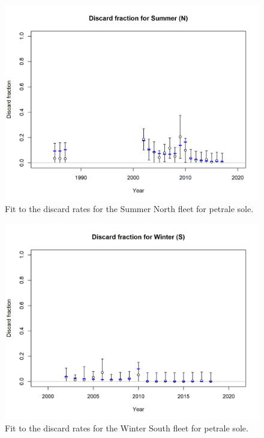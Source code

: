 \documentclass[12pt,]{article}
\begin{document}
\FloatBarrier

\begin{figure}
\centering
\includegraphics{r4ss/plots_mod1/discard_fitSummer (N).png}
\caption{Fit to the discard rates for the Summer North fleet for petrale
sole. \label{fig:fit_sn_discard}}
\end{figure}

\FloatBarrier

\begin{figure}
\centering
\includegraphics{r4ss/plots_mod1/discard_fitWinter (S).png}
\caption{Fit to the discard rates for the Winter South fleet for petrale
sole. \label{fig:fit_ws_discard}}
\end{figure}
\end{document}
